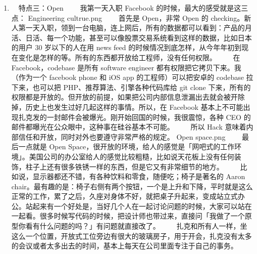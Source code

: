 \documentclass[11pt]{ctexart}
\begin{document}
\begin{enumerate}
\item 　特点三：Open
\label{sec:orgheadline21}
　　我第一天入职 Facebook 的时候，最大的感受就是这三点：
Engineering cultrue.png
　　首先是 Open，非常 Open 的 checking。新人第一天入职，领到一台电脑，连上网后，所有的数据都可以看到：产品的月活、日活、每一个功能，甚至可以像股票交易系统看到这样的数据，比如日本的用户 30 岁以下的人在用 news feed 的时候情况到底怎样，从今年年初到现在变化是怎样的等。所有的东西都开放给工程师，没有任何权限。
　　在 Facebook，codebase 是所有 software engineer 都有权限把它拷贝下来。我（作为一个 facebook phone 和 iOS app 的工程师）可以把安卓的 codebase 拉下来，也可以把 PHP、推荐算法、引擎各种代码库给 git clone 下来，所有的权限都是开放的。但开放的前提，如果把公司内部信息泄漏出去就会被开除掉，历史上也发生过好几起这样的事情。所以，在 Facebook 基本上不可能出现扎克发的一封邮件会被爆光。刚开始回国的时候，我很震惊，各种 CEO 的邮件都曝光在公众眼中，这种事在硅谷基本不可能。
　　所以 Hack 意味着内部信任和开放，同时对外也要遵守非常严格的规定。
Open space.png
　　最后一点就是 Open Space，很开放的环境，给人的感觉是「网吧式的工作环境」。美国公司的办公室给人的感觉比较粗糙，比如说天花板上没有任何装饰，柱子上还有很多铁锈一样的东西，但是它又有非常细节的地方。
　　比如说，显示器都还不错，有各种饮料和零食，随便吃；椅子是著名的 Aaron chair。最有趣的是：椅子右侧有两个按钮，一个是上升和下降，平时就是这么正常的工作，累了之后，久座对身体不好，就把桌子升起来，变成站立式办公。站起来有一个好处是，当好几个人在一起讨论问题的时候，大家可以站在一起看。很多时候写代码的时候，把设计师也带过来，直接问「我做了一个原型你看有什么问题的吗？」有问题就直接改了。
　　扎克和所有人一样，坐这么一个位置，开放式工位旁边有很大的玻璃房子，用于开会，扎克没有太多的会议或者太多出去的时间，基本上每天在公司里面专注于自己的事务。
　
\end{enumerate}
\end{document}
